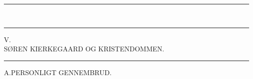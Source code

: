 \documentclass[12pt,a4paper,openany]{book}
\newcommand{\opage}[1]{\marginnote{\footnotesize\textit{[#1]}}}
\begin{document}
\begin{center}\rule{2cm}{0.4pt}\\[-8pt]\rule{2cm}{0.4pt}\end{center}

\opage{127}\begin{center}V.\\[4pt] SØREN KIERKEGAARD OG KRISTENDOMMEN.\\[4pt]\rule{1.5cm}{0.4pt}\end{center}

\begin{center}A.\quad PERSONLIGT GENNEMBRUD.\end{center}
\end{document}
